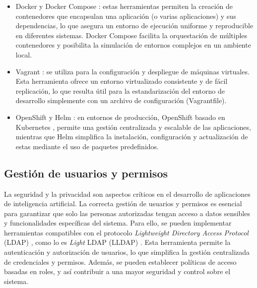\begin{itemize}
	\item Docker y Docker Compose \citep{merkel_docker_2014} \citep{docker_docker_0000}: estas herramientas permiten la creación de contenedores que encapsulan una aplicación (o varias aplicaciones) y sus dependencias, lo que asegura un entorno de ejecución uniforme y reproducible en diferentes sistemas. Docker Compose facilita la orquestación de múltiples contenedores y posibilita la simulación de entornos complejos en un ambiente local.
	\item Vagrant \citep{hashicorp_vagrant_2023} \citep{hashicorp_documentation_nodate}: se utiliza para la configuración y despliegue de máquinas virtuales. Esta herramienta ofrece un entorno virtualizado consistente y de fácil replicación, lo que resulta útil para la estandarización del entorno de desarrollo simplemente con un archivo de configuración (Vagrantfile).
	\item OpenShift \citep{red_hat_openshift_2023} \citep{red_hat_red_nodate} y Helm \citep{the_helm_authors_helm_2023} \citep{the_helm_authors_docs_nodate}: en entornos de producción, OpenShift basado en Kubernetes \citep{wikipedia_kubernetes_2025}, permite una gestión centralizada y escalable de las aplicaciones, mientras que Helm simplifica la instalación, configuración y actualización de estas mediante el uso de paquetes predefinidos.
\end{itemize}

\subsection{Gestión de usuarios y permisos}

La seguridad y la privacidad son aspectos críticos en el desarrollo de aplicaciones de inteligencia artificial. La correcta gestión de usuarios y permisos es esencial para garantizar que solo las personas autorizadas tengan acceso a datos sensibles y funcionalidades específicas del sistema. Para ello, se pueden implementar herramientas compatibles con el protocolo \textit{Lightweight Directory Access Protocol} (LDAP) \citep{wikipedia_protocolo_2024}, como lo es \textit{Light} LDAP (LLDAP) \citep{lldap_authors_lldap_2023}. Esta herramienta permite la autenticación y autorización de usuarios, lo que simplifica la gestión centralizada de credenciales y permisos. Además, se pueden establecer políticas de acceso basadas en roles, y así contribuir a una mayor seguridad y control sobre el sistema.

